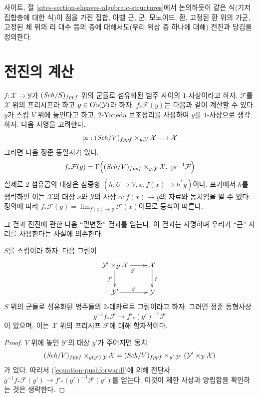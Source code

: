 \noindent
사이트, 절 \ref{sites-section-sheaves-algebraic-structures}에서
논의하듯이 같은 식(기저 집합층에 대한 식)이 점을 가진 집합, 아벨 군,
군, 모노이드, 환, 고정된 환 위의 가군, 고정된 체 위의 리 대수 등의
층에 대해서도(우리 위상 중 하나에 대해) 전진과 당김을 정의한다.








\section{전진의 계산}
\label{section-pushforward}

\noindent
$f : \mathcal{X} \to \mathcal{Y}$가 $(\mathit{Sch}/S)_{fppf}$ 위의 군들로
섬유화된 범주 사이의 $1$-사상이라고 하자. $\mathcal{F}$를
$\mathcal{X}$ 위의 프리시프라 하고 $y \in \mathop{\mathrm{Ob}}\nolimits(\mathcal{Y})$라 하자.
$f_*\mathcal{F}(y)$는 다음과 같이 계산할 수 있다. $y$가 스킴 $V$
위에 놓인다고 하고, $2$-Yoneda 보조정리를 사용하여 $y$를
$1$-사상으로 생각하자. 다음 사영을 고려한다.
$$
\text{pr} :
(\mathit{Sch}/V)_{fppf} \times_{y, \mathcal{Y}} \mathcal{X}
\longrightarrow
\mathcal{X}
$$
그러면 다음 정준 동일시가 있다.
\begin{equation}
\label{equation-pushforward}
f_*\mathcal{F}(y) = \Gamma\Big(
(\mathit{Sch}/V)_{fppf} \times_{y, \mathcal{Y}} \mathcal{X},
\ \text{pr}^{-1}\mathcal{F}\Big)
\end{equation}
실제로 $2$-섬유곱의 대상은 삼중항
$(h : U \to V, x, f(x) \to h^*y)$이다. 표기에서 $h$를 생략하면
이는 $\mathcal{X}$의 대상 $x$와 $\mathcal{Y}$의 사상
$\alpha : f(x) \to y$의 자료와 동치임을 알 수 있다. 정의에 따라
$f_*\mathcal{F}(y) = \lim_{f(x) \to y} \mathcal{F}(x)$이므로 등식이 따른다.

\medskip\noindent
그 결과 전진에 관한 다음 “밑변환” 결과를 얻는다. 이 결과는
자명하며 우리가 “큰” 자리를 사용한다는 사실에 의존한다.

\begin{lemma}
\label{lemma-base-change}
$S$를 스킴이라 하자. 다음 그림이
$$
\xymatrix{
\mathcal{Y}' \times_\mathcal{Y} \mathcal{X} \ar[r]_{g'} \ar[d]_{f'} &
\mathcal{X} \ar[d]^f \\
\mathcal{Y}' \ar[r]^g & \mathcal{Y}
}
$$
$S$ 위의 군들로 섬유화된 범주들의 $2$-데카르트 그림이라고 하자.
그러면 정준 동형사상
$$
g^{-1}f_*\mathcal{F} \longrightarrow f'_*(g')^{-1}\mathcal{F}
$$
이 있으며, 이는 $\mathcal{X}$ 위의 프리시프 $\mathcal{F}$에 대해 함자적이다.
\end{lemma}

\begin{proof}
$V$ 위에 놓인 $\mathcal{Y}'$의 대상 $y'$가 주어지면 동치
$$
(\mathit{Sch}/V)_{fppf} \times_{g(y'), \mathcal{Y}} \mathcal{X}
=
(\mathit{Sch}/V)_{fppf} \times_{y', \mathcal{Y}'}
(\mathcal{Y}' \times_\mathcal{Y} \mathcal{X})
$$
가 있다. 따라서 (\ref{equation-pushforward})에 의해 전단사
$g^{-1}f_*\mathcal{F}(y') \to f'_*(g')^{-1}\mathcal{F}(y')$를 얻는다.
이것이 제한 사상과 양립함을 확인하는 것은 생략한다.
\end{proof}

